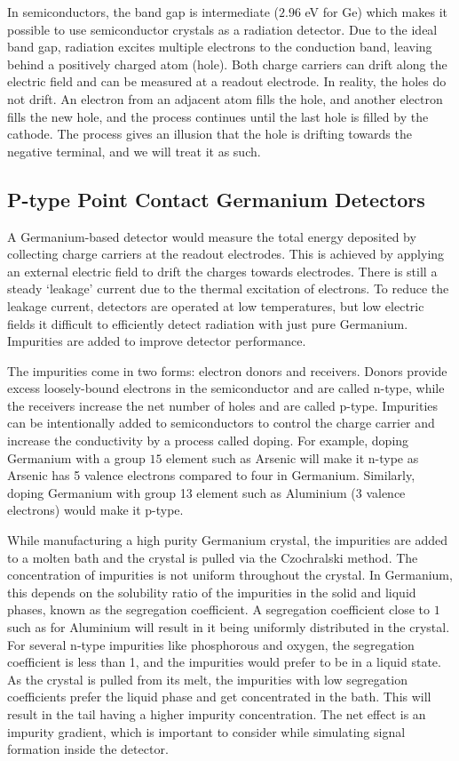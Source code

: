 In semiconductors, the band gap is intermediate ($2.96$ eV for Ge) which makes it possible to use semiconductor crystals as a radiation detector. Due to the ideal band gap, radiation excites multiple electrons to the conduction band, leaving behind a positively charged atom (hole). Both charge carriers can drift along the electric field and can be measured at a readout electrode. In reality, the holes do not drift. An electron from an adjacent atom fills the hole, and another electron fills the new hole, and the process continues until the last hole is filled by the cathode. The process gives an illusion that the hole is drifting towards the negative terminal, and we will treat it as such.

\subsection{P-type Point Contact Germanium Detectors}
A Germanium-based detector would measure the total energy deposited by collecting charge carriers at the readout electrodes. This is achieved by applying an external electric field to drift the charges towards electrodes. There is still a steady `leakage' current due to the thermal excitation of electrons. To reduce the leakage current, detectors are operated at low temperatures, but low electric fields it difficult to efficiently detect radiation with just pure Germanium. Impurities are added to improve detector performance.

The impurities come in two forms: electron donors and receivers. Donors provide excess loosely-bound electrons in the semiconductor and are called n-type, while the receivers increase the net number of holes and are called p-type. Impurities can be intentionally added to semiconductors to control the charge carrier and increase the conductivity by a process called doping. For example, doping Germanium with a group $15$ element such as Arsenic will make it n-type as Arsenic has 5 valence electrons compared to four in Germanium. Similarly, doping Germanium with group 13 element such as Aluminium (3 valence electrons) would make it p-type.

While manufacturing a high purity Germanium crystal, the impurities are added to a molten bath and the crystal is pulled via the Czochralski method. The concentration of impurities is not uniform throughout the crystal. In Germanium, this depends on the solubility ratio of the impurities in the solid and liquid phases, known as the segregation coefficient. A segregation coefficient close to $1$ such as for Aluminium will result in it being uniformly distributed in the crystal. For several n-type impurities like phosphorous and oxygen, the segregation coefficient is less than 1, and the impurities would prefer to be in a liquid state. As the crystal is pulled from its melt, the impurities with low segregation coefficients prefer the liquid phase and get concentrated in the bath. This will result in the tail having a higher impurity concentration. The net effect is an impurity gradient, which is important to consider while simulating signal formation inside the detector.

